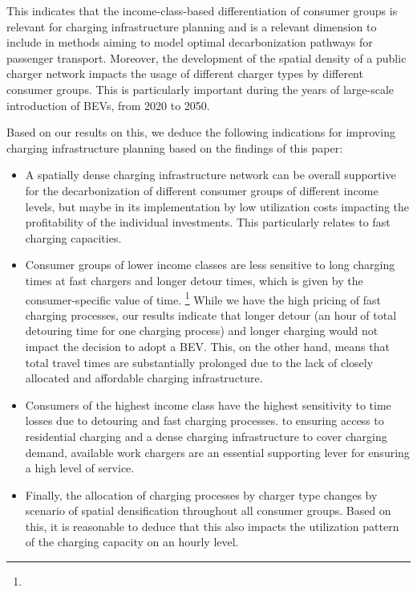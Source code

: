 \documentclass[preprint,review,11pt, authoryear]{elsarticle}
\begin{document}
    This indicates that the income-class-based differentiation of consumer groups is relevant for charging infrastructure planning and is a relevant dimension to include in methods aiming to model optimal decarbonization pathways for passenger transport. Moreover, the development of the spatial density of a public charger network impacts the usage of different charger types by different consumer groups. This is particularly important during the years of large-scale introduction of BEVs, from 2020 to 2050.

    Based on our results on this, we deduce the following indications for improving charging infrastructure planning based on the findings of this paper: 
        \begin{itemize}
            \item A spatially dense charging infrastructure network can be overall supportive for the decarbonization of different consumer groups of different income levels, but maybe in its implementation by low utilization costs impacting the profitability of the individual investments. This particularly relates to fast charging capacities.
            \item Consumer groups of lower income classes are less sensitive to long charging times at fast chargers and longer detour times, which is given by the consumer-specific value of time. \footnote{} While we have  the high pricing of fast charging processes, our results indicate that longer detour (an hour of total detouring time for one charging process) and longer charging would not impact the decision to adopt a BEV. This, on the other hand, means that total travel times are substantially prolonged due to the lack of closely allocated and affordable charging infrastructure. 
            \item Consumers of the highest income class have the highest sensitivity to time losses due to detouring and fast charging processes.  to ensuring access to residential charging and a dense charging infrastructure to cover charging demand, available work chargers are an essential supporting lever for ensuring a high level of service.  
            \item Finally, the allocation of charging processes by charger type changes by scenario of spatial densification throughout all consumer groups. Based on this, it is reasonable to deduce that this also impacts the utilization pattern of the charging capacity on an hourly level. 
        \end{itemize}
    
\end{document}
